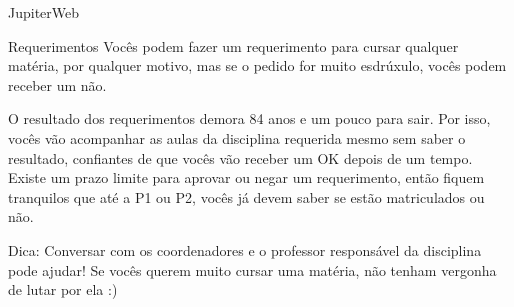 \begin{secao}{JupiterWeb}
\begin{subsecao}{Requerimentos}
Vocês podem fazer um requerimento para cursar qualquer matéria, por qualquer
motivo, mas se o pedido for muito esdrúxulo, vocês podem receber um não.

O resultado dos requerimentos demora 84 anos e um pouco para sair. Por isso,
vocês vão acompanhar as aulas da disciplina requerida mesmo sem saber o
resultado, confiantes de que vocês vão receber um OK depois de um tempo. Existe
um prazo limite para aprovar ou negar um requerimento, então fiquem tranquilos
que até a P1 ou P2, vocês já devem saber se estão matriculados ou não.

Dica: Conversar com os coordenadores e o professor responsável da disciplina
pode ajudar! Se vocês querem muito cursar uma matéria, não tenham vergonha de
lutar por ela :)

\end{subsecao}

\end{secao}
